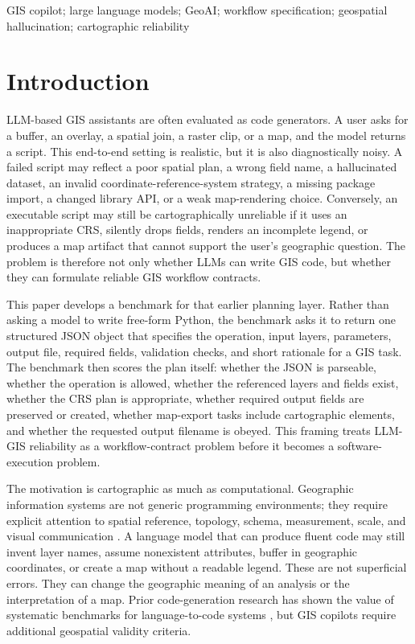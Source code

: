 \documentclass[]{interact}
\begin{document}
\begin{keywords}
GIS copilot; large language models; GeoAI; workflow specification; geospatial hallucination; cartographic reliability
\end{keywords}

\section{Introduction}

LLM-based GIS assistants are often evaluated as code generators. A user asks for a buffer, an overlay, a spatial join, a raster clip, or a map, and the model returns a script. This end-to-end setting is realistic, but it is also diagnostically noisy. A failed script may reflect a poor spatial plan, a wrong field name, a hallucinated dataset, an invalid coordinate-reference-system strategy, a missing package import, a changed library API, or a weak map-rendering choice. Conversely, an executable script may still be cartographically unreliable if it uses an inappropriate CRS, silently drops fields, renders an incomplete legend, or produces a map artifact that cannot support the user's geographic question. The problem is therefore not only whether LLMs can write GIS code, but whether they can formulate reliable GIS workflow contracts.

This paper develops a benchmark for that earlier planning layer. Rather than asking a model to write free-form Python, the benchmark asks it to return one structured JSON object that specifies the operation, input layers, parameters, output file, required fields, validation checks, and short rationale for a GIS task. The benchmark then scores the plan itself: whether the JSON is parseable, whether the operation is allowed, whether the referenced layers and fields exist, whether the CRS plan is appropriate, whether required output fields are preserved or created, whether map-export tasks include cartographic elements, and whether the requested output filename is obeyed. This framing treats LLM-GIS reliability as a workflow-contract problem before it becomes a software-execution problem.

The motivation is cartographic as much as computational. Geographic information systems are not generic programming environments; they require explicit attention to spatial reference, topology, schema, measurement, scale, and visual communication \citep{Goodchild_1992,Janowicz_2019,Roth_2013,Roth_2015}. A language model that can produce fluent code may still invent layer names, assume nonexistent attributes, buffer in geographic coordinates, or create a map without a readable legend. These are not superficial errors. They can change the geographic meaning of an analysis or the interpretation of a map. Prior code-generation research has shown the value of systematic benchmarks for language-to-code systems \citep{Li_2022,Xu_2022,Du_2024,Ni_2024,Jiang_2026}, but GIS copilots require additional geospatial validity criteria.
\end{document}

